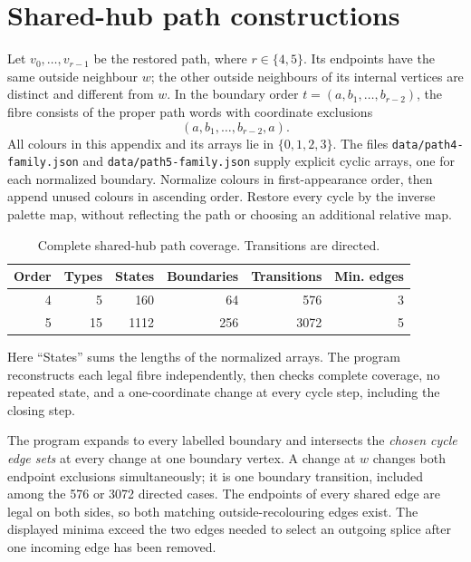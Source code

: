 \clearpage
\section{Shared-hub path constructions}
\label{app:shared-hub-path-constructions}
Let $v_0,\ldots,v_{r-1}$ be the restored path, where $r\in\{4,5\}$.
Its endpoints have the same outside neighbour $w$; the other outside
neighbours of its internal vertices are distinct and different from $w$.
In the boundary order $t=(a,b_1,\ldots,b_{r-2})$, the fibre consists
of the proper path words with coordinate exclusions
\[
 (a,b_1,\ldots,b_{r-2},a).
\]
All colours in this appendix and its arrays lie in $\{0,1,2,3\}$.
The files \texttt{data/path4-family.json} and
\texttt{data/path5-family.json} supply explicit cyclic arrays, one for
each normalized boundary. Normalize colours in first-appearance order,
then append unused colours in ascending order. Restore every cycle by
the inverse palette map, without reflecting the path or choosing
an additional relative map.

\begin{table}[htbp]
\centering
\caption{Complete shared-hub path coverage. Transitions are directed.}
\label{tab:shared-hub-path-counts}
\begin{tabular}{rrrrrr}
\toprule
Order & Types & States & Boundaries & Transitions & Min. edges\\
\midrule
4&5&160&64&576&3\\
5&15&1112&256&3072&5\\
\bottomrule
\end{tabular}
\end{table}

Here ``States'' sums the lengths of the normalized arrays. The program
reconstructs each legal fibre independently, then checks complete
coverage, no repeated state, and a one-coordinate change at every cycle
step, including the closing step.

The program expands to every labelled boundary and intersects the
\emph{chosen cycle edge sets} at every change at one boundary vertex.
A change at $w$ changes both endpoint exclusions simultaneously; it is
one boundary transition, included among the 576 or 3072 directed cases.
The endpoints of every shared edge are legal on both sides, so both
matching outside-recolouring edges exist. The displayed minima exceed
the two edges needed to select an outgoing splice after one incoming
edge has been removed.

